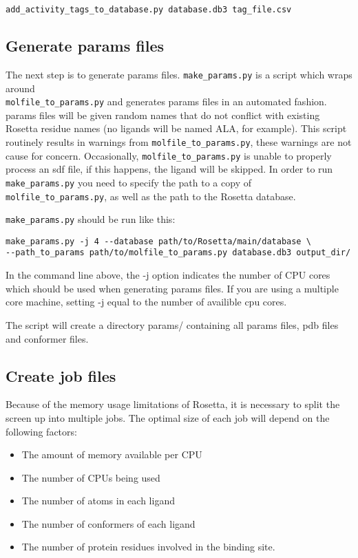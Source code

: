 \begin{verbatim}
add_activity_tags_to_database.py database.db3 tag_file.csv
\end{verbatim}

\subsection{Generate params files}

The next step is to generate params files. \texttt{make\_params.py} is a script which wraps around\\
\texttt{molfile\_to\_params.py} and generates params files in an automated fashion.
params files will be given random names that do not conflict with existing Rosetta residue names (no ligands will be named ALA, for example).
This script routinely results in warnings from \texttt{molfile\_to\_params.py}, these warnings are not cause for concern. 
Occasionally, \texttt{molfile\_to\_params.py} is unable to properly process an sdf file, if this happens, the ligand will be skipped. 
In order to run \texttt{make\_params.py} you need to specify the path to a copy of \texttt{molfile\_to\_params.py}, as well as the path to the Rosetta database.

\texttt{make\_params.py} should be run like this:

\begin{verbatim}
make_params.py -j 4 --database path/to/Rosetta/main/database \
--path_to_params path/to/molfile_to_params.py database.db3 output_dir/
\end{verbatim}

In the command line above, the -j option indicates the number of CPU cores which should be used when generating params files.
If you are using a multiple core machine, setting -j equal to the number of availible cpu cores.

The script will create a directory params/ containing all params files, pdb files and conformer files.

\subsection{Create job files}

Because of the memory usage limitations of Rosetta, it is necessary to split the screen up into multiple jobs. 
The optimal size of each job will depend on the following factors:

\begin{itemize}
\item The amount of memory available per CPU
\item The number of CPUs being used
\item The number of atoms in each ligand
\item The number of conformers of each ligand
\item The number of protein residues involved in the binding site.
\end{itemize}

